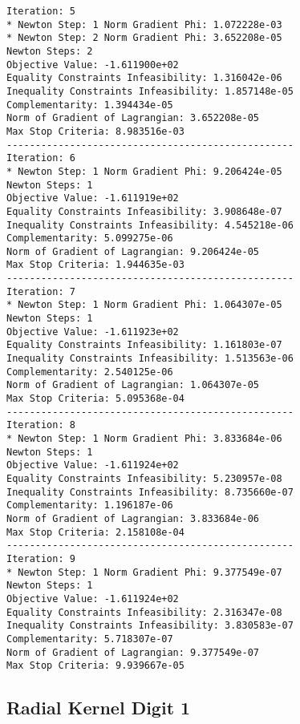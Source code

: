 \documentclass{article}
\begin{document}
\begin{minipage}[t]{0.45\textwidth}
\begin{verbatim}
Iteration: 5
* Newton Step: 1 Norm Gradient Phi: 1.072228e-03
* Newton Step: 2 Norm Gradient Phi: 3.652208e-05
Newton Steps: 2
Objective Value: -1.611900e+02
Equality Constraints Infeasibility: 1.316042e-06
Inequality Constraints Infeasibility: 1.857148e-05
Complementarity: 1.394434e-05
Norm of Gradient of Lagrangian: 3.652208e-05
Max Stop Criteria: 8.983516e-03
--------------------------------------------------
Iteration: 6
* Newton Step: 1 Norm Gradient Phi: 9.206424e-05
Newton Steps: 1
Objective Value: -1.611919e+02
Equality Constraints Infeasibility: 3.908648e-07
Inequality Constraints Infeasibility: 4.545218e-06
Complementarity: 5.099275e-06
Norm of Gradient of Lagrangian: 9.206424e-05
Max Stop Criteria: 1.944635e-03
--------------------------------------------------
Iteration: 7
* Newton Step: 1 Norm Gradient Phi: 1.064307e-05
Newton Steps: 1
Objective Value: -1.611923e+02
Equality Constraints Infeasibility: 1.161803e-07
Inequality Constraints Infeasibility: 1.513563e-06
Complementarity: 2.540125e-06
Norm of Gradient of Lagrangian: 1.064307e-05
Max Stop Criteria: 5.095368e-04
--------------------------------------------------
Iteration: 8
* Newton Step: 1 Norm Gradient Phi: 3.833684e-06
Newton Steps: 1
Objective Value: -1.611924e+02
Equality Constraints Infeasibility: 5.230957e-08
Inequality Constraints Infeasibility: 8.735660e-07
Complementarity: 1.196187e-06
Norm of Gradient of Lagrangian: 3.833684e-06
Max Stop Criteria: 2.158108e-04
--------------------------------------------------
Iteration: 9
* Newton Step: 1 Norm Gradient Phi: 9.377549e-07
Newton Steps: 1
Objective Value: -1.611924e+02
Equality Constraints Infeasibility: 2.316347e-08
Inequality Constraints Infeasibility: 3.830583e-07
Complementarity: 5.718307e-07
Norm of Gradient of Lagrangian: 9.377549e-07
Max Stop Criteria: 9.939667e-05
\end{verbatim}
\end{minipage}

\subsection{Radial Kernel Digit 1}\label{radial1}
\end{document}
